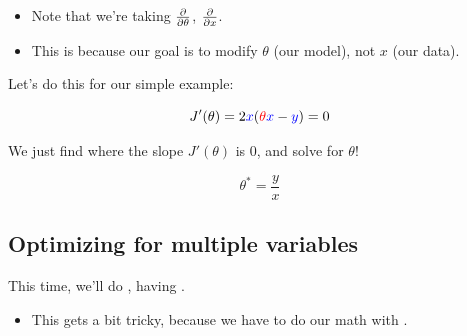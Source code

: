 
        \begin{itemize}
            \item Note that we're taking $\frac{\partial }{\partial \theta}$,  $\frac{\partial }{\partial x}$.
            \item This is because our goal is to modify $\theta$ (our model), not $x$ (our data).
        \end{itemize}

        Let's do this for our simple example:
        
        \begin{equation}
            J'(\theta) = 2\textcolor{blue}{x}(\textcolor{red}{\theta} \textcolor{blue}{x} - \textcolor{blue}{y} ) = 0
        \end{equation}
        
        We just find where the slope $J'(\theta)$ is 0, and solve for $\theta$!
        
        \begin{equation}
            \theta^* = \frac{y}{x}
        \end{equation}

        

    \phantom{}
        
    \subsection{Optimizing for multiple variables}

        This time, we'll do , having .

        \begin{itemize}
            \item This gets a bit tricky, because we have to do our math with .
        \end{itemize}
        

